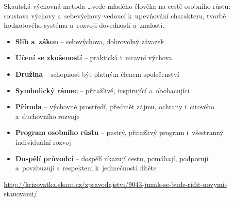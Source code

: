 \documentclass[compress,xelatex,xcolor=dvipsnames,print]{beamer}
\begin{document}
\begin{frame}{Skautská výchovná metoda}
\ldots vede mladého člověka na cestě osobního růstu: soustava výchovy a~sebevýchovy vedoucí k~upevňování charakteru, tvorbě hodnotového systému a~rozvoji dovedností a~znalostí.
\begin{itemize}
 \item \textbf{Slib a~zákon} -- sebevýchova, dobrovolný závazek
 \item \textbf{Učení se zkušeností} -- praktická i~mravní výchova
 \item \textbf{Družina} -- schopnost být platným členem společenství
 \item \textbf{Symbolický rámec} -- přitažlivé, inspirující a~obohacující
 \item \textbf{Příroda} -- výchovné prostředí, předmět zájmu, ochrany i~citového a~duchovního rozvoje
 \item \textbf{Program osobního růstu} -- pestrý, přitažlivý program i~všestranný individuální rozvoj
 \item \textbf{Dospělí průvodci} -- dospělí ukazují cestu, pomáhají, podporují a~povzbuzují s~respektem k~jedinečnosti dítěte
\end{itemize}
\begin{tiny}\href{http://krizovatka.skaut.cz/zpravodajstvi/9043-junak-se-bude-ridit-novymi-stanovami/}{http://krizovatka.skaut.cz/zpravodajstvi/9043-junak-se-bude-ridit-novymi-stanovami/}\end{tiny}
\end{frame}
\end{document}
